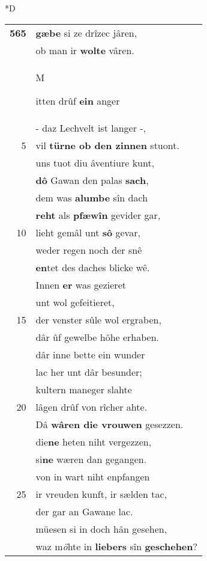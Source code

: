 \documentclass[8pt,a4paper,notitlepage]{article}
\begin{document}
\begin{table}[ht]
\begin{minipage}[t]{0.5\linewidth}
\small
\begin{center}*D
\end{center}
\begin{tabular}{rl}
\textbf{565} & \textbf{gæbe} si ze drîzec jâren,\\ 
 & ob man ir \textbf{wolte} vâren.\\ 
 & \begin{large}M\end{large}itten drûf \textbf{ein} anger\\ 
 & - daz Lechvelt ist langer -,\\ 
5 & vil \textbf{türne ob den zinnen} stuont.\\ 
 & uns tuot diu âventiure kunt,\\ 
 & \textbf{dô} Gawan den palas \textbf{sach},\\ 
 & dem was \textbf{alumbe} sîn dach\\ 
 & \textbf{reht} als \textbf{pfæwîn} gevider gar,\\ 
10 & lieht gemâl unt \textbf{sô} gevar,\\ 
 & weder regen noch der snê\\ 
 & \textbf{en}tet des daches blicke wê.\\ 
 & Innen \textbf{er} was gezieret\\ 
 & unt wol gefeitieret,\\ 
15 & der venster sûle wol ergraben,\\ 
 & dâr ûf gewelbe hôhe erhaben.\\ 
 & dâr inne bette ein wunder\\ 
 & lac her unt dâr besunder;\\ 
 & kultern maneger slahte\\ 
20 & lâgen drûf von rîcher ahte.\\ 
 & Dâ \textbf{wâren die vrouwen} gesezzen.\\ 
 & die\textbf{ne} heten niht vergezzen,\\ 
 & si\textbf{ne} wæren dan gegangen.\\ 
 & von in wart niht enpfangen\\ 
25 & ir vreuden kunft, ir sælden tac,\\ 
 & der gar an Gawane lac.\\ 
 & müesen si in doch hân gesehen,\\ 
 & waz m\textit{ö}hte in \textbf{liebers} sîn \textbf{geschehen}?\\ 

\end{tabular}
\end{minipage}
\end{table}
\end{document}
